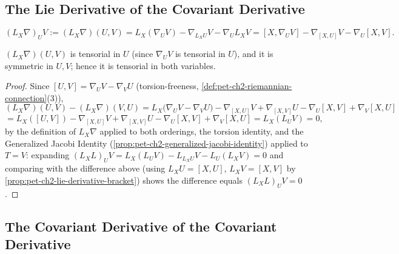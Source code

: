 \subsection{The Lie Derivative of the Covariant Derivative}

\begin{definition}
  \label{def:pet-ch2-lie-derivative-connection}
  \leanok
  \[
    (L_X\nabla)_UV := (L_X\nabla)(U,V)
    = L_X(\nabla_UV)-\nabla_{L_XU}V-\nabla_UL_XV
    = [X,\nabla_UV]-\nabla_{[X,U]}V-\nabla_U[X,V].
  \]
\end{definition}

\begin{remark}
  \label{rem:pet-ch2-lie-derivative-connection-symmetric}
  \leanok
  $(L_X\nabla)(U,V)$ is tensorial in $U$ (since $\nabla_UV$ is tensorial in
  $U$), and it is symmetric in $U,V$; hence it is tensorial in both
  variables.
\end{remark}
\begin{proof}
  \leanok
  Since $[U,V]=\nabla_UV-\nabla_VU$ (torsion-freeness,
  \cref{def:pet-ch2-riemannian-connection}(3)),
  \[
    (L_X\nabla)(U,V)-(L_X\nabla)(V,U)
    = L_X\big(\nabla_UV-\nabla_VU\big)-\nabla_{[X,U]}V+\nabla_{[X,V]}U-\nabla_U[X,V]+\nabla_V[X,U]
  \]
  \[
    = L_X([U,V])-\nabla_{[X,U]}V+\nabla_{[X,V]}U-\nabla_U[X,V]+\nabla_V[X,U]
    = L_X(L_UV) = 0,
  \]
  by the definition of $L_X\nabla$ applied to both orderings, the torsion
  identity, and the Generalized Jacobi Identity
  (\cref{prop:pet-ch2-generalized-jacobi-identity}) applied to $T=V$: expanding
  $(L_XL)_UV=L_X(L_UV)-L_{L_XU}V-L_U(L_XV)=0$ and comparing with the
  difference above (using $L_XU=[X,U]$, $L_XV=[X,V]$ by
  \cref{prop:pet-ch2-lie-derivative-bracket}) shows the difference equals
  $(L_XL)_UV=0$.
\end{proof}

\subsection{The Covariant Derivative of the Covariant Derivative}

